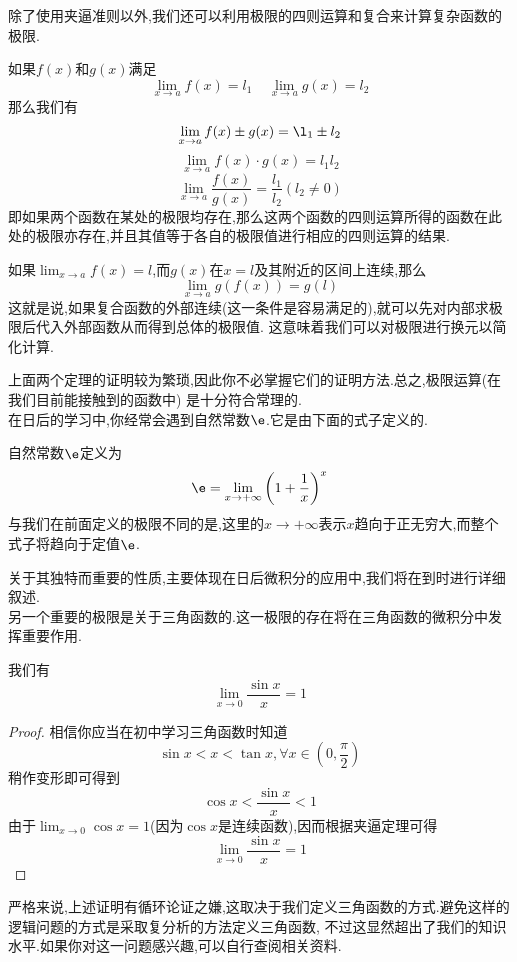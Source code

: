 \documentclass{ctexart}
\begin{document}
除了使用夹逼准则以外,我们还可以利用极限的四则运算和复合来计算复杂函数的极限.
\begin{theorem}[0A.1.4 极限的四则运算]
    如果$f(x)$和$g(x)$满足
    \[\lim_{x\to a}f(x)=l_1\ \ \ \ \ \lim_{x\to a}g(x)=l_2\]
    那么我们有
    \[\lim_{x\to a}f(x)\pm g(x)=\l_1\pm l_2\]
    \[\lim_{x\to a}f(x)\cdot g(x)=l_1l_2\]
    \[\lim_{x\to a}\dfrac{f(x)}{g(x)}=\dfrac{l_1}{l_2}\left(l_2\neq0\right)\]
    即如果两个函数在某处的极限均存在,那么这两个函数的四则运算所得的函数在此处的极限亦存在,并且其值等于各自的极限值进行相应的四则运算的结果.
\end{theorem}
\begin{theorem}[0A.1.5 复合函数的极限]
    如果$\displaystyle\lim_{x\to a}f(x)=l$,而$g(x)$在$x=l$及其附近的区间上连续,那么
    \[\lim_{x\to a}g(f(x))=g(l)\]
    这就是说,如果复合函数的外部连续(这一条件是容易满足的),就可以先对内部求极限后代入外部函数从而得到总体的极限值.%
    这意味着我们可以对极限进行换元以简化计算.
\end{theorem}
上面两个定理的证明较为繁琐,因此你不必掌握它们的证明方法.总之,极限运算(在我们目前能接触到的函数中)%
是十分符合常理的.\vspace{4pt}\\
\indent 在日后的学习中,你经常会遇到自然常数$\e$.它是由下面的式子定义的.
\begin{definition}[0A.1.6 自然常数]
    自然常数$\e$定义为
    \[\e=\lim_{x\to+\infty}\left(1+\dfrac1x\right)^x\]
    与我们在前面定义的极限不同的是,这里的$x\to+\infty$表示$x$趋向于正无穷大,而整个式子将趋向于定值$\e$.
\end{definition}
关于其独特而重要的性质,主要体现在日后微积分的应用中,我们将在到时进行详细叙述.\\
\indent 另一个重要的极限是关于三角函数的.这一极限的存在将在三角函数的微积分中发挥重要作用.
\begin{theorem}[0A.1.7 重要极限II]
    我们有
    \[\lim_{x\to0}\dfrac{\sin x}{x}=1\]

\end{theorem}
\begin{proof}
    相信你应当在初中学习三角函数时知道
    \[\sin x<x<\tan x,\forall x\in\left(0,\dfrac\pi2\right)\]
    稍作变形即可得到
    \[\cos x<\dfrac{\sin x}{x}<1\]
    由于$\displaystyle\lim_{x\to0}\cos x=1$(因为$\cos x$是连续函数),因而根据夹逼定理可得
    \[\lim_{x\to0}\dfrac{\sin x}{x}=1\]

\end{proof}
\begin{hint}
    严格来说,上述证明有循环论证之嫌,这取决于我们定义三角函数的方式.避免这样的逻辑问题的方式是采取复分析的方法定义三角函数,%
    不过这显然超出了我们的知识水平.如果你对这一问题感兴趣,可以自行查阅相关资料.
\end{hint}
\end{document}
